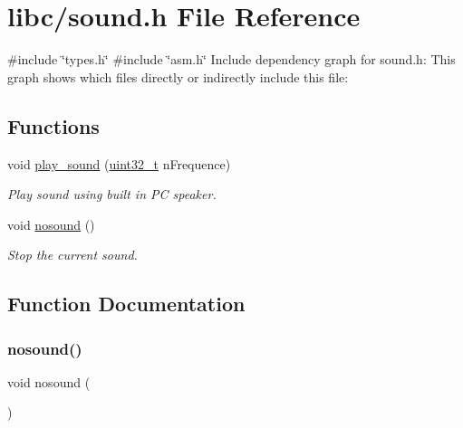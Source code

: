 \hypertarget{a00026}{}\section{libc/sound.h File Reference}
\label{a00026}
{\ttfamily \#include \char`\"{}types.\+h\char`\"{}}\newline
{\ttfamily \#include \char`\"{}asm.\+h\char`\"{}}\newline
Include dependency graph for sound.\+h\+:
This graph shows which files directly or indirectly include this file\+:
\subsection*{Functions}
\begin{DoxyCompactItemize}
\item 
void \hyperlink{a00026_a343fdfaf89e2f331018341d580fa2b82_a343fdfaf89e2f331018341d580fa2b82}{play\+\_\+sound} (\hyperlink{a00038_a435d1572bf3f880d55459d9805097f62_a435d1572bf3f880d55459d9805097f62}{uint32\+\_\+t} n\+Frequence)
\begin{DoxyCompactList}\small\item\em Play sound using built in PC speaker. \end{DoxyCompactList}\item 
void \hyperlink{a00026_a9872c92510e3088cd9765c9e59a85636_a9872c92510e3088cd9765c9e59a85636}{nosound} ()
\begin{DoxyCompactList}\small\item\em Stop the current sound. \end{DoxyCompactList}\end{DoxyCompactItemize}


\subsection{Function Documentation}
\mbox{\label{a00026_a9872c92510e3088cd9765c9e59a85636_a9872c92510e3088cd9765c9e59a85636}} 
\subsubsection{\texorpdfstring{nosound()}{nosound()}}
{\footnotesize\ttfamily void nosound (\begin{DoxyParamCaption}{ }\end{DoxyParamCaption})}



